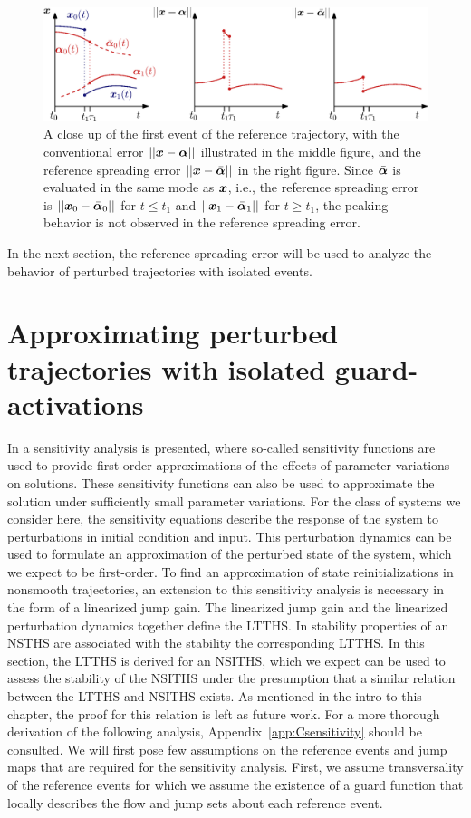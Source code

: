 \documentclass[../DC2017114Bouma.tex]{subfiles}
\begin{document}
\begin{figure}[bt!]
\centering
\includegraphics[width=\textwidth]{refspreaderrors.eps}\caption{A close up of the  first event of the reference trajectory, with the conventional error $||{\boldsymbol{x}}-\boldsymbol{\alpha}||$ illustrated in the middle figure, and the reference spreading error $||{\boldsymbol{x}}-\bar{\boldsymbol{\alpha}}||$ in the right figure. Since $\bar{\boldsymbol{\alpha}}$ is evaluated in the same mode as ${\boldsymbol{x}}$, i.e., the reference spreading error is $||{\boldsymbol{x}}_0 - \bar{\boldsymbol{\alpha}}_0||$ for $t\leq t_1$ and $||{\boldsymbol{x}}_1 - \bar{\boldsymbol{\alpha}}_1||$ for $t\geq t_1$, the peaking behavior is not observed in the reference spreading error.}\label{fig:3refspreaderrors}
\end{figure}

In the next section, the reference spreading error will be used to analyze the behavior of perturbed trajectories with isolated events.

\section{Approximating perturbed trajectories with isolated guard-activations}\label{sec:3approx}
In \cite{Khalil1996} a sensitivity analysis is presented, where so-called sensitivity functions are used to provide first-order approximations of the effects of parameter variations on solutions. These sensitivity functions can also be used to approximate the solution under sufficiently small parameter variations. For the class of systems we consider here, the sensitivity equations describe the response of the system to perturbations in initial condition and input. This perturbation dynamics can be used to formulate an approximation of the perturbed state of the system, which we expect to be first-order. To find an approximation of state reinitializations in nonsmooth trajectories, an extension to this sensitivity analysis is necessary in the form of a linearized jump gain. The linearized jump gain and the linearized perturbation dynamics together define the LTTHS. In \cite{Rijnen2017} stability properties of an NSTHS are associated with the stability the corresponding LTTHS. In this section, the LTTHS is derived for an NSITHS, which we expect can be used to assess the stability of the NSITHS under the presumption that a similar relation between the LTTHS and NSITHS exists. As mentioned in the intro to this chapter, the proof for this relation is left as future work. For a more thorough derivation of the following analysis, Appendix~\ref{app:Csensitivity} should be consulted. We will first pose few assumptions on the reference events and jump maps that are required for the sensitivity analysis. First, we assume transversality of the reference events for which we assume the existence of a guard function that locally describes the flow and jump sets about each reference event.
\end{document}

